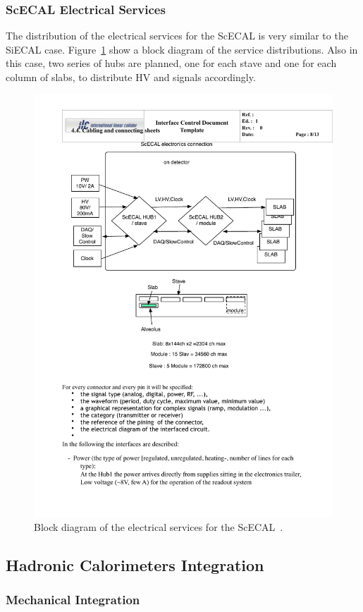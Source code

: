 \subsubsection{ScECAL Electrical Services}
The distribution of the electrical services for the ScECAL is very similar to the SiECAL case. Figure~\ref{ILD:fig:scecal_block_diagram} show a block diagram of the service distributions. Also in this case, two series of hubs are planned, one for each stave and one for each column of slabs, to distribute HV and signals accordingly.
\begin{figure}[h!]
    \centering
        \includegraphics[width=0.8\hsize]{Integration/fig/ScECAL_Block_Diagram.pdf}
    \caption{Block diagram of the electrical services for the ScECAL~\cite{ild:bib:ScECAL_ICD}.}
    \label{ILD:fig:scecal_block_diagram}
\end{figure}


\subsection{Hadronic Calorimeters Integration}
\subsubsection{Mechanical Integration}

